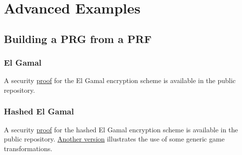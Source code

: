 
\chapter{Advanced Examples}

\section{Building a PRG from a PRF}



%


\subsection{El Gamal}
A security \href{file:../examples/elgamal.ec}{proof} for the El Gamal encryption scheme is available in the public
repository.

\subsection{Hashed El Gamal}
A security \href{file:../examples/hashed_elgamal.ec}{proof} for the hashed El Gamal encryption scheme is available in the
public repository. \href{file:../examples/hashed_elgamal_generic.ec}{Another version} illustrates the use of some generic game transformations.


